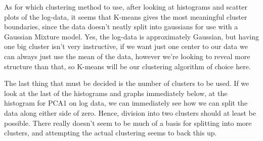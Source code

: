 \documentclass{article}
\begin{document}
As for which clustering method to use, after looking at histograms and
scatter plots of the log-data, it seems that K-means gives the most
meaningful cluster boundaries, since the data doesn't neatly split into
gaussians for use with a Gaussian Mixture model. Yes, the log-data is
approximately Gaussian, but having one big cluster isn't very
instructive, if we want just one center to our data we can always just
use the mean of the data, however we're looking to reveal more structure
than that, so K-means will be our clustering algorithm of choice here.

The last thing that must be decided is the number of clusters to be
used. If we look at the last of the histograms and graphs immediately
below, at the histogram for PCA1 on log data, we can immediately see how
we can split the data along either side of zero. Hence, division into
two clusters should at least be possible. There really doesn't seem to
be much of a basis for splitting into more clusters, and attempting the
actual clustering seems to back this up.
\end{document}
